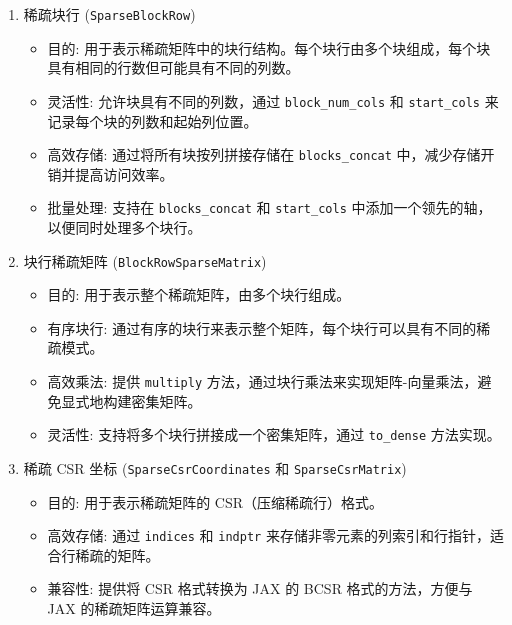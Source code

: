 \documentclass{ctexart}
\begin{document}
\begin{enumerate}
\item 稀疏块行 (\texttt{SparseBlockRow})

\begin{itemize}
	\item 目的: 用于表示稀疏矩阵中的块行结构。每个块行由多个块组成，每个块具有相同的行数但可能具有不同的列数。

	\item 灵活性: 允许块具有不同的列数，通过 \texttt{block\_num\_cols} 和 \texttt{start\_cols} 来记录每个块的列数和起始列位置。

	\item 高效存储: 通过将所有块按列拼接存储在 \texttt{blocks\_concat} 中，减少存储开销并提高访问效率。

	\item 批量处理: 支持在 \texttt{blocks\_concat} 和 \texttt{start\_cols} 中添加一个领先的轴，以便同时处理多个块行。
\end{itemize}
\item 块行稀疏矩阵 (\texttt{BlockRowSparseMatrix})

\begin{itemize}
	\item 目的: 用于表示整个稀疏矩阵，由多个块行组成。

	\item 有序块行: 通过有序的块行来表示整个矩阵，每个块行可以具有不同的稀疏模式。

	\item 高效乘法: 提供 \texttt{multiply} 方法，通过块行乘法来实现矩阵-向量乘法，避免显式地构建密集矩阵。

	\item 灵活性: 支持将多个块行拼接成一个密集矩阵，通过 \texttt{to\_dense} 方法实现。
\end{itemize}

\item 稀疏 CSR 坐标 (\texttt{SparseCsrCoordinates} 和 \texttt{SparseCsrMatrix})

\begin{itemize}
	\item 目的: 用于表示稀疏矩阵的 CSR（压缩稀疏行）格式。

	\item 高效存储: 通过 \texttt{indices} 和 \texttt{indptr} 来存储非零元素的列索引和行指针，适合行稀疏的矩阵。

	\item 兼容性: 提供将 CSR 格式转换为 JAX 的 BCSR 格式的方法，方便与 JAX 的稀疏矩阵运算兼容。
\end{itemize}


\end{enumerate}
\end{document}
